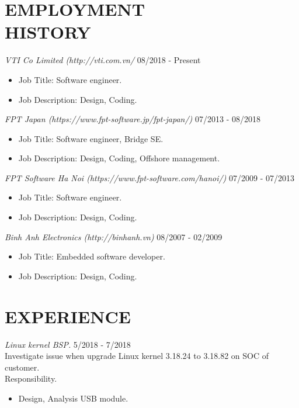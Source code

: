 \documentclass[margin]{res}
\begin{document}
\begin{resume}
 
\section{EMPLOYMENT \\ HISTORY}
		{\sl VTI Co Limited (http://vti.com.vn/}  \hfill 08/2018 - Present
                 \begin{itemize}  \itemsep -2pt  %
                 \item Job Title: Software engineer.
		 \item Job Description:  Design, Coding. 
                 \end{itemize}

		{\sl FPT Japan (https://www.fpt-software.jp/fpt-japan/)}  \hfill 07/2013 - 08/2018
                 \begin{itemize}  \itemsep -2pt  %
                 \item Job Title: Software engineer, Bridge SE.
		 \item Job Description:  Design, Coding, Offshore management. 
                 \end{itemize}

		 {\sl FPT Software Ha Noi (https://www.fpt-software.com/hanoi/)}  \hfill 07/2009 - 07/2013
                 \begin{itemize}  \itemsep -2pt  %
                 \item Job Title: Software engineer.
		 \item Job Description: Design, Coding.
                 \end{itemize}

		 {\sl Binh Anh Electronics (http://binhanh.vn)}   \hfill 08/2007 - 02/2009
                 \begin{itemize}  \itemsep -2pt  %
		 \item Job Title: Embedded software developer. 
		 \item Job Description: Design, Coding.
                 \end{itemize}
        
\section{EXPERIENCE}
                {\sl Linux kernel BSP.} \hfill            5/2018 - 7/2018 \\
		 Investigate issue when upgrade Linux kernel 3.18.24 to 3.18.82 on SOC of customer.\\
		 Responsibility.
                 \begin{itemize}  \itemsep -2pt %
                 \item Design, Analysis USB module.
                 \end{itemize}


\end{resume}
\end{document}
